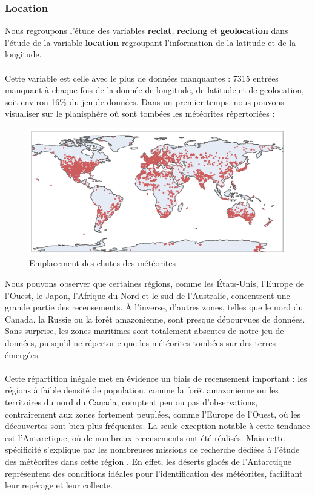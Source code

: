 \documentclass[12pt]{article}
\begin{document}
\subsubsection*{Location}
Nous regroupons l'étude des variables \textbf{reclat}, \textbf{reclong} et \textbf{geolocation} dans l'étude de la variable \textbf{location} regroupant l'information de la latitude et de la longitude.\\
\\
Cette variable est celle avec le plus de données manquantes : 7315 entrées manquant à chaque fois de la donnée de longitude, de latitude et de geolocation, soit environ 16\% du jeu de données. Dans un premier temps, nous pouvons visualiser sur le planisphère où sont tombées les météorites répertoriées :\\
\begin{figure}[H]
\centering
\includegraphics[width=14cm]{Images/exploration/points_monde.png}
\caption{Emplacement des chutes des météorites}
\end{figure}
Nous pouvons observer que certaines régions, comme les États-Unis, l’Europe de l’Ouest, le Japon, l’Afrique du Nord et le sud de l’Australie, concentrent une grande partie des recensements. À l’inverse, d’autres zones, telles que le nord du Canada, la Russie ou la forêt amazonienne, sont presque dépourvues de données. Sans surprise, les zones maritimes sont totalement absentes de notre jeu de données, puisqu’il ne répertorie que les météorites tombées sur des terres émergées.\\
\\
Cette répartition inégale met en évidence un biais de recensement important : les régions à faible densité de population, comme la forêt amazonienne ou les territoires du nord du Canada, comptent peu ou pas d’observations, contrairement aux zones fortement peuplées, comme l’Europe de l’Ouest, où les découvertes sont bien plus fréquentes. La seule exception notable à cette tendance est l’Antarctique, où de nombreux recensements ont été réalisés. Mais cette spécificité s’explique par les nombreuses missions de recherche dédiées à l’étude des météorites dans cette région \cite{Mission_recherche_antartictique}. En effet, les déserts glacés de l’Antarctique représentent des conditions idéales pour l’identification des météorites, facilitant leur repérage et leur collecte.\\
\end{document}
